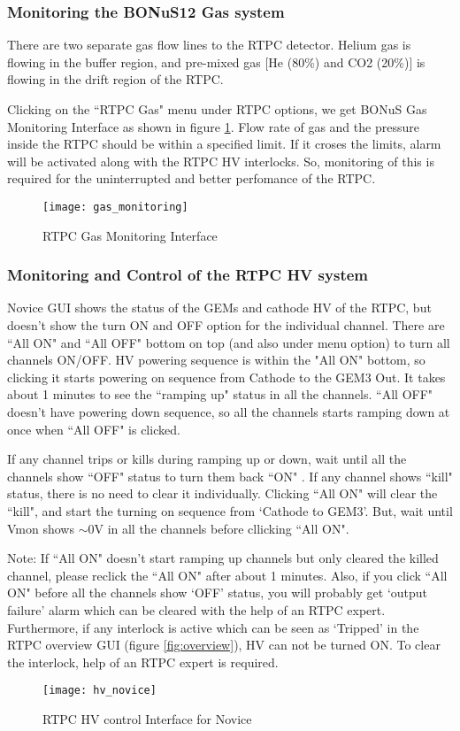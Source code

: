 \subsubsection{Monitoring the BONuS12 Gas system}
\label{sub-sec:gasflow}

There are two separate gas flow lines to the RTPC detector. Helium gas is flowing in the buffer region, and pre-mixed gas [He (80\%) and CO2 (20\%)] is flowing in the drift region of the RTPC.

Clicking on the ``RTPC Gas" menu under RTPC options, we get BONuS Gas Monitoring Interface as shown in figure \ref{fig:gas_monitoring}. Flow rate of gas and the pressure inside the RTPC should be within a specified limit. If it croses the limits, alarm will be activated along with the RTPC HV interlocks. So, monitoring of this is required for the uninterrupted and better perfomance of the RTPC. 
\begin{figure}[H]
	\centering
	\texttt{[image: gas\_monitoring]}
	\caption{RTPC Gas Monitoring Interface}
	\label{fig:gas_monitoring}
\end{figure}

\subsubsection{Monitoring and Control of the RTPC HV system}
\label{sub-sec:HV}

Novice GUI shows the status of the GEMs and cathode HV of the RTPC, but doesn't show the turn ON and OFF option for the individual channel. There are ``All ON" and ``All OFF" bottom on top (and also under menu option) to turn all channels ON/OFF. HV powering sequence is within the "All ON" bottom, so clicking it starts powering on sequence from Cathode to the GEM3 Out. It takes about 1 minutes to see the ``ramping up" status in all the channels. ``All OFF" doesn't have powering down sequence, so all the channels starts ramping down at once when ``All OFF" is clicked.

If any channel trips or kills during ramping up or down, wait until all the channels show ``OFF" status to turn them back ``ON" . If any channel shows ``kill" status, there is no need to clear it individually. Clicking ``All ON" will clear the ``kill", and start the turning on sequence from `Cathode to GEM3'. But, wait until Vmon shows $\sim$0V  in all the channels before cllicking ``All ON".

{\color{red}Note:} If ``All ON" doesn't start ramping up channels but only cleared the killed channel, please reclick the ``All ON" after about 1 minutes. Also, if you click ``All ON" before all the channels show `OFF' status, you will probably get `output failure' alarm which can be cleared with the help of an RTPC expert. Furthermore, if any interlock is active which can be seen as `Tripped' in the RTPC overview GUI (figure \ref{fig:overview}), HV can not be turned ON. To clear the interlock, help of an RTPC expert is required.
\begin{figure}[H]
	\centering
	\texttt{[image: hv\_novice]}
	\caption{RTPC HV control Interface for Novice}
	\label{fig:hv_novice1}
\end{figure}


